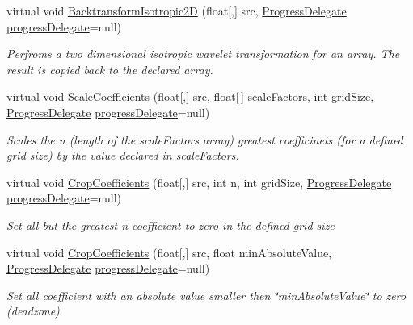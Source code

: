 \begin{DoxyCompactItemize}
virtual void \hyperlink{class_turbo_wavelets_1_1_wavelet2_d_ac1644fb0d5f8a2ba8f265b445cba454b}{Backtransform\+Isotropic2\+D} (float\mbox{[},\mbox{]} src, \hyperlink{class_turbo_wavelets_1_1_wavelet2_d_aec52fe74aa08e073119064ef4ac3fe93}{Progress\+Delegate} \hyperlink{class_turbo_wavelets_1_1_wavelet2_d_a41d9135f22a6b2cb661b2cc2ccb768ff}{progress\+Delegate}=null)
\begin{DoxyCompactList}\small\item\em Perfroms a two dimensional isotropic wavelet transformation for an array. The result is copied back to the declared array. \end{DoxyCompactList}\item 
virtual void \hyperlink{class_turbo_wavelets_1_1_wavelet2_d_a55e3f96cb79da6cc4621ccc1118a0d6f}{Scale\+Coefficients} (float\mbox{[},\mbox{]} src, float\mbox{[}$\,$\mbox{]} scale\+Factors, int grid\+Size, \hyperlink{class_turbo_wavelets_1_1_wavelet2_d_aec52fe74aa08e073119064ef4ac3fe93}{Progress\+Delegate} \hyperlink{class_turbo_wavelets_1_1_wavelet2_d_a41d9135f22a6b2cb661b2cc2ccb768ff}{progress\+Delegate}=null)
\begin{DoxyCompactList}\small\item\em Scales the n (length of the scale\+Factors array) greatest coefficinets (for a defined grid size) by the value declared in scale\+Factors. \end{DoxyCompactList}\item 
virtual void \hyperlink{class_turbo_wavelets_1_1_wavelet2_d_aa1e399d2ab5f85843185a2895bf7f7ad}{Crop\+Coefficients} (float\mbox{[},\mbox{]} src, int n, int grid\+Size, \hyperlink{class_turbo_wavelets_1_1_wavelet2_d_aec52fe74aa08e073119064ef4ac3fe93}{Progress\+Delegate} \hyperlink{class_turbo_wavelets_1_1_wavelet2_d_a41d9135f22a6b2cb661b2cc2ccb768ff}{progress\+Delegate}=null)
\begin{DoxyCompactList}\small\item\em Set all but the greatest n coefficient to zero in the defined grid size \end{DoxyCompactList}\item 
virtual void \hyperlink{class_turbo_wavelets_1_1_wavelet2_d_a9abbbf0cffd0d8dca5d78d6ad4dad399}{Crop\+Coefficients} (float\mbox{[},\mbox{]} src, float min\+Absolute\+Value, \hyperlink{class_turbo_wavelets_1_1_wavelet2_d_aec52fe74aa08e073119064ef4ac3fe93}{Progress\+Delegate} \hyperlink{class_turbo_wavelets_1_1_wavelet2_d_a41d9135f22a6b2cb661b2cc2ccb768ff}{progress\+Delegate}=null)
\begin{DoxyCompactList}\small\item\em Set all coefficient with an absolute value smaller then \char`\"{}min\+Absolute\+Value\char`\"{} to zero (deadzone) \end{DoxyCompactList}\item 

\end{DoxyCompactItemize}
